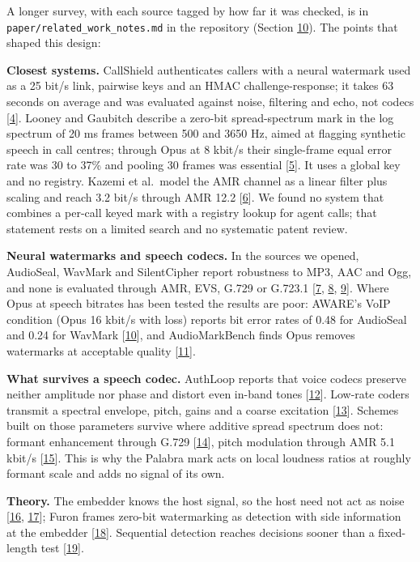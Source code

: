 \documentclass[10pt,a4paper]{article}
\begin{document}
A longer survey, with each source tagged by how far it was checked, is in \texttt{paper/related\_work\_notes.md} in the repository (Section \hyperref[s-10]{10}). The points that shaped this design:

\textbf{Closest systems.} CallShield authenticates callers with a neural watermark used as a 25 bit/s link, pairwise keys and an HMAC challenge-response; it takes 63 seconds on average and was evaluated against noise, filtering and echo, not codecs {[}\hyperlink{ref-4}{4}{]}. Looney and Gaubitch describe a zero-bit spread-spectrum mark in the log spectrum of 20 ms frames between 500 and 3650 Hz, aimed at flagging synthetic speech in call centres; through Opus at 8 kbit/s their single-frame equal error rate was 30 to 37\% and pooling 30 frames was essential {[}\hyperlink{ref-5}{5}{]}. It uses a global key and no registry. Kazemi et al.~model the AMR channel as a linear filter plus scaling and reach 3.2 bit/s through AMR 12.2 {[}\hyperlink{ref-6}{6}{]}. We found no system that combines a per-call keyed mark with a registry lookup for agent calls; that statement rests on a limited search and no systematic patent review.

\textbf{Neural watermarks and speech codecs.} In the sources we opened, AudioSeal, WavMark and SilentCipher report robustness to MP3, AAC and Ogg, and none is evaluated through AMR, EVS, G.729 or G.723.1 {[}\hyperlink{ref-7}{7}, \hyperlink{ref-8}{8}, \hyperlink{ref-9}{9}{]}. Where Opus at speech bitrates has been tested the results are poor: AWARE's VoIP condition (Opus 16 kbit/s with loss) reports bit error rates of 0.48 for AudioSeal and 0.24 for WavMark {[}\hyperlink{ref-10}{10}{]}, and AudioMarkBench finds Opus removes watermarks at acceptable quality {[}\hyperlink{ref-11}{11}{]}.

\textbf{What survives a speech codec.} AuthLoop reports that voice codecs preserve neither amplitude nor phase and distort even in-band tones {[}\hyperlink{ref-12}{12}{]}. Low-rate coders transmit a spectral envelope, pitch, gains and a coarse excitation {[}\hyperlink{ref-13}{13}{]}. Schemes built on those parameters survive where additive spread spectrum does not: formant enhancement through G.729 {[}\hyperlink{ref-14}{14}{]}, pitch modulation through AMR 5.1 kbit/s {[}\hyperlink{ref-15}{15}{]}. This is why the Palabra mark acts on local loudness ratios at roughly formant scale and adds no signal of its own.

\textbf{Theory.} The embedder knows the host signal, so the host need not act as noise {[}\hyperlink{ref-16}{16}, \hyperlink{ref-17}{17}{]}; Furon frames zero-bit watermarking as detection with side information at the embedder {[}\hyperlink{ref-18}{18}{]}. Sequential detection reaches decisions sooner than a fixed-length test {[}\hyperlink{ref-19}{19}{]}.
\end{document}
